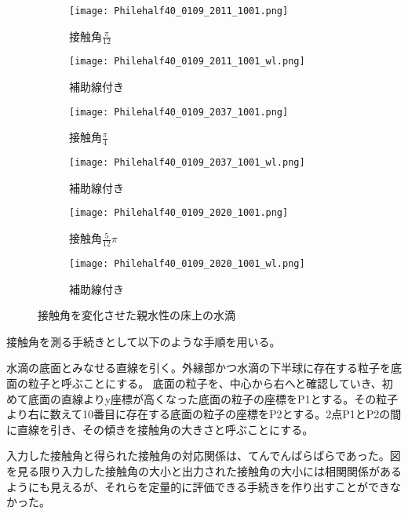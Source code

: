 \documentclass[]{jsarticle}
\begin{document}
\begin{figure}[H]
  \centering
  \begin{subfigure}{0.4\columnwidth}
    \centering
    \texttt{[image: Philehalf40\_0109\_2011\_1001.png]}
    \caption{接触角$\frac{\pi}{12}$}
    \label{fig:phile_pi6}
  \end{subfigure}
  \begin{subfigure}{0.4\columnwidth}
    \centering
    \texttt{[image: Philehalf40\_0109\_2011\_1001\_wl.png]}
    \caption{補助線付き}
    \label{fig:phile_pi6wl}
  \end{subfigure}

  \begin{subfigure}{0.4\columnwidth}
    \centering
    \texttt{[image: Philehalf40\_0109\_2037\_1001.png]}
    \caption{接触角$\frac{\pi}{4}$}
    \label{fig:phile_pi4}
  \end{subfigure}
  \begin{subfigure}{0.4\columnwidth}
    \centering
    \texttt{[image: Philehalf40\_0109\_2037\_1001\_wl.png]}
    \caption{補助線付き}
    \label{fig:phile_pi4wl}
  \end{subfigure}
  \begin{subfigure}{0.4\columnwidth}
    \centering
    \texttt{[image: Philehalf40\_0109\_2020\_1001.png]}
    \caption{接触角$\frac{5}{12}\pi$}
    \label{fig:phile_pi3}
  \end{subfigure}
  \begin{subfigure}{0.4\columnwidth}
    \centering
    \texttt{[image: Philehalf40\_0109\_2020\_1001\_wl.png]}
    \caption{補助線付き}
    \label{fig:phile_pi3wl}
  \end{subfigure}

  \caption{接触角を変化させた親水性の床上の水滴}
\end{figure}

接触角を測る手続きとして以下のような手順を用いる。

水滴の底面とみなせる直線を引く。外縁部かつ水滴の下半球に存在する粒子を底面の粒子と呼ぶことにする。
底面の粒子を、中心から右へと確認していき、初めて底面の直線よりy座標が高くなった底面の粒子の座標をP1とする。その粒子より右に数えて10番目に存在する底面の粒子の座標をP2とする。2点P1とP2の間に直線を引き、その傾きを接触角の大きさと呼ぶことにする。

入力した接触角と得られた接触角の対応関係は、てんでんばらばらであった。図を見る限り入力した接触角の大小と出力された接触角の大小には相関関係があるようにも見えるが、それらを定量的に評価できる手続きを作り出すことができなかった。
\end{document}
